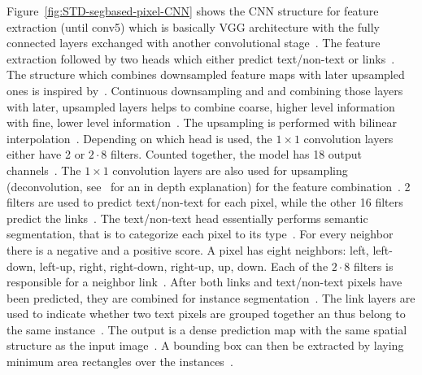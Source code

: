Figure~\ref{fig:STD-segbased-pixel-CNN} shows the \ac{CNN} structure for feature extraction
(until conv5) which is basically VGG architecture with the fully connected layers exchanged with
another convolutional stage~\citep{deng_pixellink_2018}.
The feature extraction followed by two heads which either predict text/non-text or
links~\citep{deng_pixellink_2018}.
The structure which combines downsampled feature maps with later upsampled ones is inspired
by~\cite{long_fully_2015}.
Continuous downsampling and and combining those layers with later, upsampled layers helps
to combine coarse, higher level information with fine, lower level
information~\citep{long_fully_2015}.
The upsampling is performed with bilinear interpolation~\citep{deng_pixellink_2018}.
Depending on which head is used, the $1\times1$ convolution layers either have 2 or $2\cdot8$ filters.
Counted together, the model has 18 output channels~\citep{deng_pixellink_2018}.
The $1\times1$ convolution layers are also used for upsampling (deconvolution,
see~\cite{noh_learning_2015,long_fully_2015} for an in depth explanation)
for the feature combination~\citep{deng_pixellink_2018}.
2 filters are used to predict text/non-text for each pixel, while the other 16 filters predict
the links~\citep{deng_pixellink_2018}.
The text/non-text head essentially performs semantic segmentation, that is to categorize each
pixel to its type~\citep{deng_pixellink_2018}.
For every neighbor there is a negative and a positive score.
A pixel has eight neighbors: left, left-down, left-up, right, right-down, right-up, up, down.
Each of the $2\cdot8$ filters is responsible for a neighbor link~\citep{deng_pixellink_2018}.
After both links and text/non-text pixels have been predicted, they are combined for instance
segmentation~\citep{deng_pixellink_2018}.
The link layers are used to indicate whether two text pixels are grouped together an thus belong to
the same instance~\citep{deng_pixellink_2018}.
The output is a dense prediction map with the same spatial structure as the input
image~\citep{deng_pixellink_2018}.
A bounding box can then be extracted by laying minimum area rectangles over the
instances~\citep{deng_pixellink_2018}.


